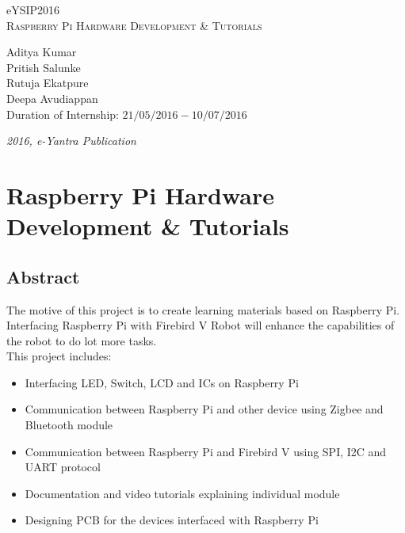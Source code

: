 \documentclass[a4paper,12pt,oneside]{book}
\begin{document}
\begin{titlepage}
\raggedright
{\Large eYSIP2016\\[1cm]}
{\Huge\scshape Raspberry Pi Hardware Development \& Tutorials \\[.1in]}
\vfill
\begin{flushright}
{\large Aditya Kumar \\}
{\large Pritish Salunke \\}
{\large Rutuja Ekatpure \\}
{\large Deepa Avudiappan \\}
{\large Duration of Internship: $ 21/05/2016-10/07/2016 $ \\}
\end{flushright}

{\itshape 2016, e-Yantra Publication}
\end{titlepage}

\chapter[Project Tag]{Raspberry Pi Hardware Development \& Tutorials}
\section*{Abstract}
The motive of this project is to create learning materials based on Raspberry Pi. Interfacing Raspberry Pi with Firebird V Robot will enhance the capabilities of the robot to do lot more tasks.\\ 
This project includes:
\begin{itemize}
    \item Interfacing LED, Switch, LCD and ICs on Raspberry Pi
    \item    Communication between Raspberry Pi and other device using Zigbee and Bluetooth module
    \item Communication between Raspberry Pi and Firebird V using SPI, I2C and UART protocol
    \item Documentation and video tutorials explaining individual module
    \item Designing PCB for the devices interfaced with Raspberry Pi
\end{itemize}
\end{document}

